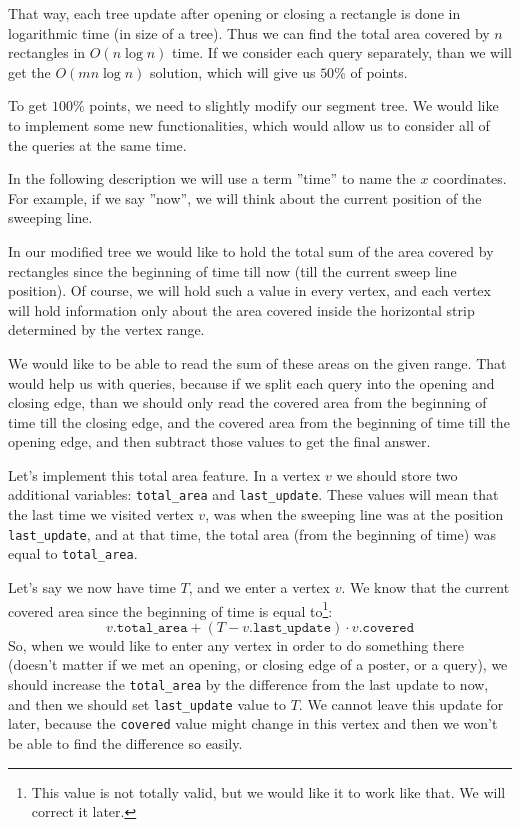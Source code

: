 That way, each tree update after opening or closing a rectangle is done in logarithmic time (in size of a tree).
Thus we can find the total area covered by $n$ rectangles in $O(n \log n)$ time.
If we consider each query separately, than we will get the $O(m n \log n)$ solution,
	which will give us $50\%$ of points.



To get $100\%$ points, we need to slightly modify our segment tree.
We would like to implement some new functionalities,
	which would allow us to consider all of the queries at the same time.

In the following description we will use a term ''time'' to name the $x$ coordinates.
For example, if we say ''now'', we will think about the current position of the sweeping line.

In our modified tree we would like to hold the total sum of the area covered by rectangles
	since the beginning of time till now (till the current sweep line position).
Of course, we will hold such a value in every vertex, and each vertex will
	hold information only about the area covered inside the horizontal strip
	determined by the vertex range.

We would like to be able to read the sum of these areas on the given range.
That would help us with queries, because if we split each query into the opening and closing edge,
	than we should only read the covered area from the beginning of time till the closing edge,
	and the covered area from the beginning of time till the opening edge,
	and then subtract those values
	to get the final answer.

Let's implement this total area feature.
In a vertex $v$ we should store two additional variables: \texttt{total\_area} and \texttt{last\_update}.
These values will mean that the last time we visited vertex $v$,
	was when the sweeping line was at the position \texttt{last\_update},
	and at that time, the total area (from the beginning of time) was equal to \texttt{total\_area}.

Let's say we now have time $T$, and we enter a vertex $v$.
We know that the current covered area since the beginning of time is equal to\footnote{
	This value is not totally valid, but we would like it to work like that.
	We will correct it later.
}:
\[
	v.\texttt{total\_area} + (T - v.\texttt{last\_update}) \cdot v.\texttt{covered}
\]
So, when we would like to enter any vertex in order to do something there
	(doesn't matter if we met an opening, or closing edge of a poster, or a query),
	we should increase the \texttt{total\_area} by the difference from the last update to now,
	and then we should set \texttt{last\_update} value to $T$.
We cannot leave this update for later, because the \texttt{covered} value might change in this vertex
	and then we won't be able to find the difference so easily.

